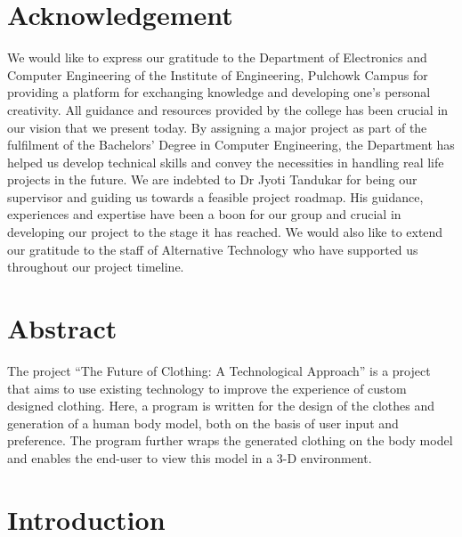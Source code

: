 \documentclass{article}
\begin{document}
    \section*{Acknowledgement}
We would like to express our gratitude to the Department of Electronics and Computer Engineering of the Institute of Engineering, Pulchowk Campus for providing a platform for exchanging knowledge and developing one’s personal creativity. All guidance and resources provided by the college has been crucial in our vision that we present today. By assigning a major project as part of the fulfilment of the Bachelors’ Degree in Computer Engineering, the Department has helped us develop technical skills and convey the necessities in handling real life projects in the future.
We are indebted to Dr Jyoti Tandukar for being our supervisor and guiding us towards a feasible project roadmap. His guidance, experiences and expertise have been a boon for our group and crucial in developing our project to the stage it has reached. We would also like to extend our gratitude to the staff of Alternative Technology who have supported us throughout our project timeline.



\newpage

\section*{Abstract}
The project “The Future of Clothing: A Technological Approach” is a project that aims to use existing technology to improve the experience of custom designed clothing. Here, a program is written for the design of the clothes and generation of a human body model, both on the basis of user input and preference. The program further wraps the generated clothing on the body model and enables the end-user to view this model in a 3-D environment.
\newpage

\tableofcontents
\listoffigures


\newpage
{}
\section{Introduction}
\end{document}
